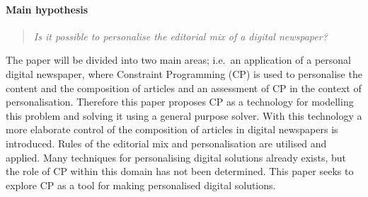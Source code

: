 \paragraph{Main hypothesis}
\label{sec:hypothesis}
\begin{quotation}
	\emph{Is it possible to personalise the editorial mix of a digital newspaper?}
\end{quotation}
The paper will be divided into two main areas; i.e.\ an application of a personal digital newspaper, where Constraint Programming (CP) is used to personalise the content and the composition of articles and an assessment of CP in the context of personalisation.
Therefore this paper proposes CP as a technology for modelling this problem and solving it using a general purpose solver. With this technology a more elaborate control of the composition of articles in digital newspapers is introduced. Rules of the editorial mix and personalisation are utilised and applied. Many techniques for personalising digital solutions already exists, but the role of CP within this domain has not been determined. This paper seeks to explore CP as a tool for making personalised digital solutions.%

